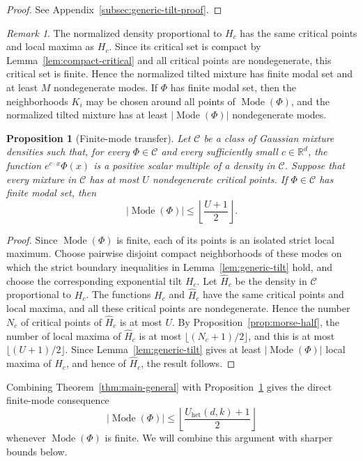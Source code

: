 \documentclass[11pt]{article}
\theoremstyle{plain}
\newtheorem{proposition}[theorem]{Proposition}
\theoremstyle{definition}
\theoremstyle{remark}
\newtheorem{remark}[theorem]{Remark}
\numberwithin{equation}{section}
\DeclareMathOperator{\Mode}{Mode}
\newcommand{\R}{\mathbb{R}}
\begin{document}
\begin{proof}
See Appendix~\ref{subsec:generic-tilt-proof}.
\end{proof}

\begin{remark}\label{rem:generic-tilt-consequences}
The normalized density proportional to $H_c$ has the same critical points and local maxima as $H_c$. Since its critical set is compact by Lemma~\ref{lem:compact-critical} and all critical points are nondegenerate, this critical set is finite. Hence the normalized tilted mixture has finite modal set and at least $M$ nondegenerate modes. If $\Phi$ has finite modal set, then the neighborhoods $K_i$ may be chosen around all points of $\Mode(\Phi)$, and the normalized tilted mixture has at least $|\Mode(\Phi)|$ nondegenerate modes.
\end{remark}

\begin{proposition}[Finite-mode transfer]\label{prop:finite-mode-transfer}
Let $\mathcal C$ be a class of Gaussian mixture densities such that, for every $\Phi\in\mathcal C$ and every sufficiently small $c\in\R^d$, the function $e^{c\cdot x}\Phi(x)$ is a positive scalar multiple of a density in $\mathcal C$. Suppose that every mixture in $\mathcal C$ has at most $U$ nondegenerate critical points. If $\Phi\in\mathcal C$ has finite modal set, then
\[
|\Mode(\Phi)|\le \left\lfloor\frac{U+1}{2}\right\rfloor.
\]
\end{proposition}

\begin{proof}
Since $\Mode(\Phi)$ is finite, each of its points is an isolated strict local maximum. Choose pairwise disjoint compact neighborhoods of these modes on which the strict boundary inequalities in Lemma~\ref{lem:generic-tilt} hold, and choose the corresponding exponential tilt $H_c$. Let $\widehat H_c$ be the density in $\mathcal C$ proportional to $H_c$. The functions $H_c$ and $\widehat H_c$ have the same critical points and local maxima, and all these critical points are nondegenerate. Hence the number $N_c$ of critical points of $\widehat H_c$ is at most $U$. By Proposition~\ref{prop:morse-half}, the number of local maxima of $\widehat H_c$ is at most $\lfloor(N_c+1)/2\rfloor$, and this is at most $\lfloor(U+1)/2\rfloor$. Since Lemma~\ref{lem:generic-tilt} gives at least $|\Mode(\Phi)|$ local maxima of $H_c$, and hence of $\widehat H_c$, the result follows.
\end{proof}

Combining Theorem~\ref{thm:main-general} with Proposition~\ref{prop:finite-mode-transfer} gives the direct finite-mode consequence
\[
|\Mode(\Phi)|\le \left\lfloor\frac{U_{\mathrm{het}}(d,k)+1}{2}\right\rfloor
\]
whenever $\Mode(\Phi)$ is finite. We will combine this argument with sharper bounds below.
\end{document}
